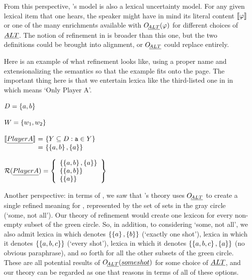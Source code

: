 \documentclass[leqno]{article}
\begin{document}
From this perspective, \CFS's model is also a lexical uncertainty
model. For any given lexical item that one hears, the speaker might
have in mind its literal content $\llbracket\varphi\rrbracket$ or one of the many
enrichments available with $\mathop{O\negthinspace_{\emph{ALT}}}(\varphi)$ for different choices
of $\emph{ALT}$. The notion of refinement in  is broader than
this one, but the two definitions could be brought into alignment, or
$\mathop{O\negthinspace_{\emph{ALT}}}$ could replace  entirely.

Here is an example of what refinement looks like, using a proper name
and extensionalizing the semantics so that the example fits onto the
page.  The important thing here is that we entertain lexica like the
third-listed one in  in which
 means `Only Player A'.

\begin{examples}
\item\label{refinement-ex}
  
  \begin{examples}
  \item $D = \left\{ a,b \right\}$
  \item $W = \left\{ w_{1}, w_{2} \right\}$
  \item  $\begin{array}[t]{@{} r@{ \ = \ }l}
            \sem{\word{Player A}} 
            & \set{Y \subseteq D : \playera \in Y} \\
            & \set{ \set{a,b}, \set{a} }
          \end{array}$  
   \item\label{ex-refinements} 
     $\mathcal{R}(\emph{Player A}) = 
     \left\{ 
       \begin{array}[c]{l}
         \left\{ \left\{ a,b \right\}, \left\{ a \right\} \right\}  \\
         \left\{ \left\{ a,b \right\} \right\} \\
         \left\{ \left\{ a \right\} \right\} \\
       \end{array}
      \right\}$
  \end{examples}
\end{examples}

Another perspective: in terms of , we saw that
\CFS's theory uses $\mathop{O\negthinspace_{\emph{ALT}}}$ to create a single refined meaning for
, represented by the set of sets in the gray circle
(`some, not all'). Our theory of refinement would create one lexicon
for every non-empty subset of the green circle. So, in addition, to
considering `some, not all', we also admit lexica in which  denotes $\left\{ \left\{ a \right\}, \left\{ b \right\} \right\}$ (`exactly one shot'),
lexica in which it denotes $\left\{ \left\{ a,b,c \right\} \right\}$ (`every shot'), lexica
in which it denotes $\left\{ \left\{ a,b,c \right\},\left\{ a \right\} \right\}$ (no obvious
paraphrase), and so forth for all the other subsets of the green
circle. These are all potential results of $\mathop{O\negthinspace_{\emph{ALT}}}(\emph{some shot})$
for some choice of $\emph{ALT}$, and our theory can be regarded as one that
reasons in terms of all of these options.
\end{document}

